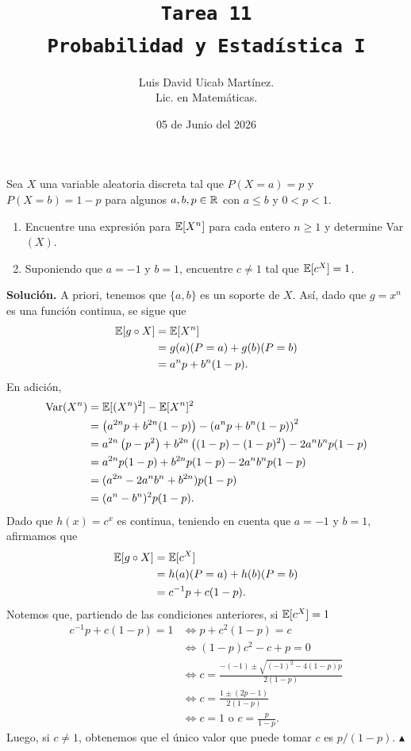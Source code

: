 \documentclass[11pt]{scrartcl}
\title{\texttt{Tarea 11
\\ Probabilidad y Estadística I}}
\author{Luis David Uicab Martínez. 
\\Lic. en Matemáticas.}
\date{05 de Junio del 2026}
\begin{document}
\maketitle
\begin{center}
\end{center}

\begin{mdframed}[style=mdpurplebox, frametitle={Ejercicio 01, Tarea 11, Probabilidad y Estadística I}]
    Sea $X$ una variable aleatoria discreta tal que $P(X=a)=p$ y $P(X=b)=1-p$  para algunos $a,b,p\in \mathbb R$
    con $a\leq b$ y $0 < p < 1$.
    \begin{enumerate}
        \item Encuentre una expresión para $\mathbb E[X^n]$ para cada entero $n\geq 1$ y determine Var$(X)$.
        \item Suponiendo que $a=-1$ y $b=1$, encuentre $c\neq 1$ tal que $\mathbb E[c^X]=1$.
    \end{enumerate}
\end{mdframed}
\textbf{Solución.} A priori, tenemos que $\{a,b\}$ es un soporte de $X$. Así, dado que $g=x^n$ es una función
continua, se sigue que
\begin{align*}
    \mathbb E[g\circ X] &= \mathbb E[X^n] \\
    &= g(a)(P=a)+g(b)(P=b) \\
    &= a^np + b^n(1-p).
\end{align*}
En adición,
\begin{align*}
    \text{Var}(X^n) &= \mathbb E[(X^n)^2] - \mathbb E[X^n]^2 \\
    &= \left(a^{2n}p + b^{2n}(1-p)\right) - \left(a^{n}p + b^{n}(1-p)\right)^2 \\
    &= a^{2n}\left(p-p^2\right) + b^{2n}\left((1-p)-(1-p)^2\right) -2a^nb^np(1-p) \\
    &= a^{2n}p(1-p) + b^{2n}p(1-p) -2a^nb^np(1-p) \\
    &= (a^{2n}-2a^nb^n+b^{2n})p(1-p) \\
    &= (a^n-b^n)^{2}p(1-p).
\end{align*}
Dado que $h(x)=c^x$ es continua, teniendo en cuenta que $a=-1$ y $b=1$, afirmamos que
\begin{align*}
    \mathbb E[g\circ X] &= \mathbb E[c^X] \\
    &= h(a)(P=a)+h(b)(P=b) \\
    &= c^{-1}p + c(1-p).
\end{align*}
Notemos que, partiendo de las condiciones anteriores, si $\mathbb E[c^X]=1$
\begin{align*}
    c^{-1}p + c(1-p)=1 &\iff p + c^2(1-p) = c \\
    &\iff (1-p)c^2 -c +p = 0 \\
    &\iff c=\frac{-(-1)\pm\sqrt{(-1)^2-4(1-p)p}}{2(1-p)} \\
    &\iff c=\frac{1\pm (2p-1)}{2(1-p)} \\
    &\iff c=1 \text{ o } c=\frac{p}{1-p}.
\end{align*}
Luego, si $c\neq 1$, obtenemos que el único valor que puede tomar $c$ es $p/(1-p)$. $\blacktriangle$
\newpage
\end{document}
